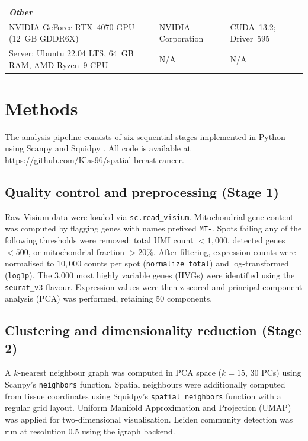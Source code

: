 \documentclass[12pt, a4paper]{article}
\begin{document}
\begin{longtable}{p{4.5cm} p{4.8cm} p{5.3cm}}
\multicolumn{3}{l}{\textit{\textbf{Other}}} \\[2pt]

NVIDIA GeForce RTX~4070 GPU (12~GB GDDR6X) &
NVIDIA Corporation &
CUDA~13.2; Driver~595 \\[4pt]

Server: Ubuntu 22.04 LTS, 64~GB RAM,
AMD Ryzen~9 CPU &
N/A &
N/A \\[4pt]

\end{longtable}
\endgroup

\section{Methods}

The analysis pipeline consists of six sequential stages implemented in Python using Scanpy \citep{wolf2018} and Squidpy \citep{palla2022}. All code is available at \url{https://github.com/Klas96/spatial-breast-cancer}.

\subsection{Quality control and preprocessing (Stage 1)}

Raw Visium data were loaded via \texttt{sc.read\_visium}. Mitochondrial gene content was computed by flagging genes with names prefixed \texttt{MT-}. Spots failing any of the following thresholds were removed: total UMI count $<1{,}000$, detected genes $<500$, or mitochondrial fraction $>20\%$. After filtering, expression counts were normalised to $10{,}000$ counts per spot (\texttt{normalize\_total}) and log-transformed (\texttt{log1p}). The 3,000 most highly variable genes (HVGs) were identified using the \texttt{seurat\_v3} flavour. Expression values were then z-scored and principal component analysis (PCA) was performed, retaining 50 components.

\subsection{Clustering and dimensionality reduction (Stage 2)}

A $k$-nearest neighbour graph was computed in PCA space ($k=15$, 30 PCs) using Scanpy's \texttt{neighbors} function. Spatial neighbours were additionally computed from tissue coordinates using Squidpy's \texttt{spatial\_neighbors} function with a regular grid layout. Uniform Manifold Approximation and Projection (UMAP) was applied for two-dimensional visualisation. Leiden community detection \citep{traag2019} was run at resolution 0.5 using the igraph backend.
\end{document}
